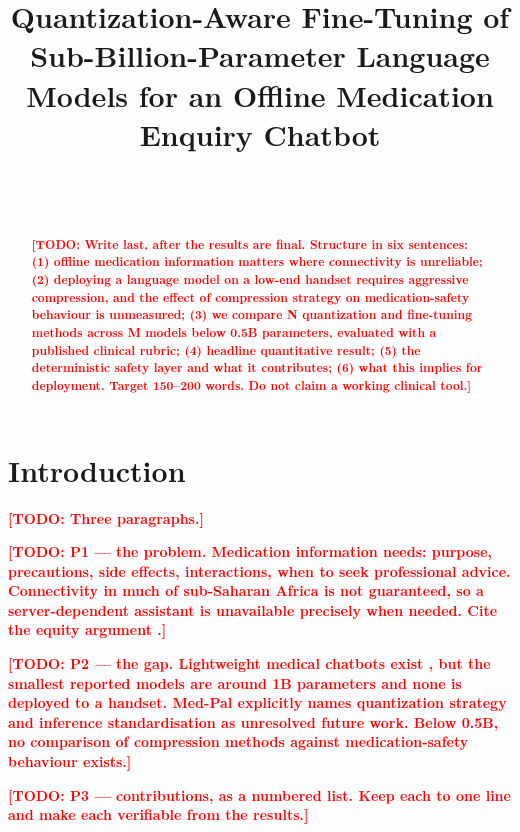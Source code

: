 \documentclass[10pt,twocolumn]{article}
\title{\textbf{Quantization-Aware Fine-Tuning of Sub-Billion-Parameter Language
Models for an Offline Medication Enquiry Chatbot}}
\author{
  \TODO{Author} \\
  \TODO{Institution} \\
  \texttt{\TODO{email}}
}
\date{}
\newcommand{\TODO}[1]{\textcolor{red}{\textbf{[TODO: #1]}}}
\begin{document}
\maketitle

\begin{abstract}
\TODO{Write last, after the results are final. Structure in six sentences:
(1) offline medication information matters where connectivity is unreliable;
(2) deploying a language model on a low-end handset requires aggressive
compression, and the effect of compression strategy on medication-safety
behaviour is unmeasured; (3) we compare N quantization and fine-tuning methods
across M models below 0.5B parameters, evaluated with a published clinical
rubric; (4) headline quantitative result; (5) the deterministic safety layer
and what it contributes; (6) what this implies for deployment. Target 150--200
words. Do not claim a working clinical tool.}
\end{abstract}

\section{Introduction}

\TODO{Three paragraphs.}

\TODO{P1 --- the problem. Medication information needs: purpose, precautions,
side effects, interactions, when to seek professional advice. Connectivity in
much of sub-Saharan Africa is not guaranteed, so a server-dependent assistant
is unavailable precisely when needed. Cite the equity argument
\citep{ong2024ethical}.}

\TODO{P2 --- the gap. Lightweight medical chatbots exist
\citep{elangovan2025medpal,labrak2024biomistral,kim2025meerkat}, but the
smallest reported models are around 1B parameters and none is deployed to a
handset. Med-Pal explicitly names quantization strategy and inference
standardisation as unresolved future work. Below 0.5B, no comparison of
compression methods against medication-safety behaviour exists.}

\TODO{P3 --- contributions, as a numbered list. Keep each to one line and make
each verifiable from the results.}
\end{document}
